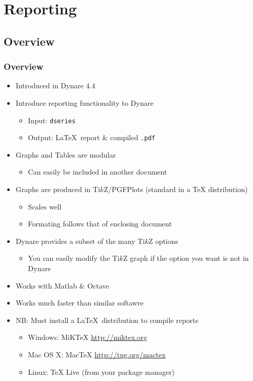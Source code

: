 \documentclass[10pt]{beamer}
\newcommand{\myitem}{\item[$\bullet$]}
\begin{document}
%
%
\section{Reporting}
\subsection{Overview}
\begin{frame}
  \frametitle{Overview}
  \begin{itemize}
  \myitem Introduced in Dynare 4.4
  \myitem Introduce reporting functionality to Dynare
      \begin{itemize}
      \myitem Input: \texttt{dseries}
      \myitem Output: \LaTeX\ report \& compiled \texttt{.pdf}
      \end{itemize}
    \myitem Graphs and Tables are modular
      \begin{itemize}
      \myitem Can easily be included in another document
      \end{itemize}
    \myitem Graphs are produced in Ti$k$Z/PGFPlots (standard in a TeX distribution)
      \begin{itemize}
      \myitem Scales well
      \myitem Formating follows that of enclosing document
      \end{itemize}
    \myitem Dynare provides a subset of the many Ti$k$Z options
      \begin{itemize}
      \myitem You can easily modify the Ti$k$Z graph if the option you want is not in Dynare
      \end{itemize}
    \myitem Works with Matlab \& Octave
    \myitem Works much faster than similar softawre
    \myitem NB: Must install a \LaTeX\ distribution to compile reports
      \begin{itemize}
      \myitem Windows: MiKTeX \url{http://miktex.org}
      \myitem Mac OS X: MacTeX \url{http://tug.org/mactex}
      \myitem Linux: TeX Live (from your package manager)
      \end{itemize}
  \end{itemize}
\end{frame}
\end{document}
